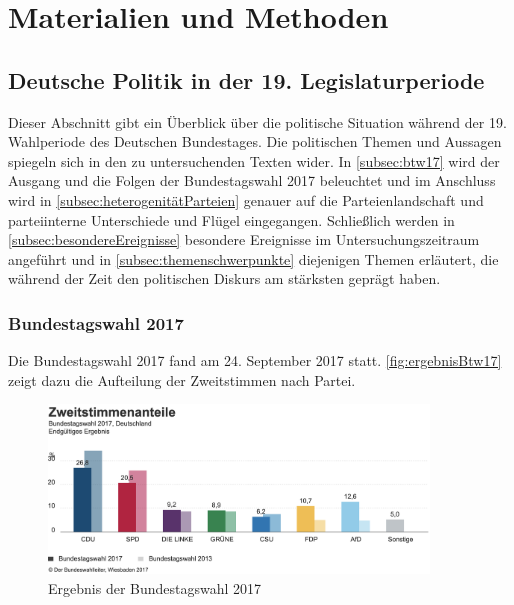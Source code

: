 
\chapter{Materialien und Methoden} \label{ch:materialsAndMethods}



\section{Deutsche Politik in der 19. Legislaturperiode}

Dieser Abschnitt gibt ein Überblick über die politische Situation während der \num{19}. Wahlperiode des Deutschen Bundestages. Die politischen Themen und Aussagen spiegeln sich in den zu untersuchenden Texten wider. In \autoref{subsec:btw17} wird der Ausgang und die Folgen der Bundestagswahl \num{2017} beleuchtet und im Anschluss wird in \autoref{subsec:heterogenitätParteien} genauer auf die Parteienlandschaft und parteiinterne Unterschiede und Flügel eingegangen. Schließlich werden in \autoref{subsec:besondereEreignisse} besondere Ereignisse im Untersuchungszeitraum angeführt und in \autoref{subsec:themenschwerpunkte} diejenigen Themen erläutert, die während der Zeit den politischen Diskurs am stärksten geprägt haben.

\subsection{Bundestagswahl \num{2017}} \label{subsec:btw17}

Die Bundestagswahl \num{2017} fand am \num{24}. September \num{2017} statt. \autoref{fig:ergebnisBtw17} zeigt dazu die Aufteilung der Zweitstimmen nach Partei.

\begin{figure}[H]
    \centering
    \includegraphics[width=0.9\textwidth]{data/images/ergebnisBtw17.png}
    \caption{Ergebnis der Bundestagswahl \num{2017} \autocite{noauthor_bundestagswahl_nodate}} \label{fig:ergebnisBtw17}
\end{figure}

